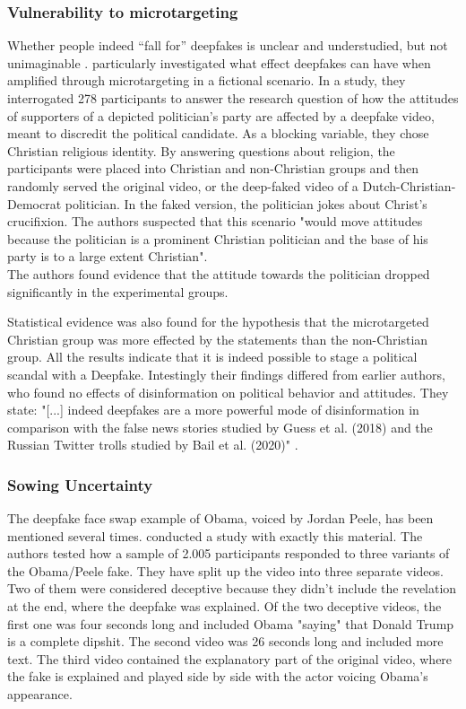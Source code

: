 \documentclass[
  a4paper,  %
  twoside,  %
  bibliography=totoc,
  headsepline,
  cleardoublepage=empty,
  parskip=half,
  draft=false
]{scrbook}
\begin{document}
\subsubsection*{Vulnerability to microtargeting}
Whether people indeed “fall for” deepfakes is unclear and understudied, but not unimaginable \cite{dobberMicrotargetedDeepfakesHave2021}. \citet{dobberMicrotargetedDeepfakesHave2021} particularly investigated what effect deepfakes can have when amplified through microtargeting in a fictional scenario. In a study, they interrogated 278 participants to answer the research question of how the attitudes of supporters of a depicted politician's party are affected by a deepfake video, meant to discredit the political candidate. As a blocking variable, they chose Christian religious identity. By answering questions about religion, the participants were placed into Christian and non-Christian groups and then randomly served the original video, or the deep-faked video of a Dutch-Christian-Democrat politician. In the faked version, the politician jokes about Christ's crucifixion. The authors suspected that this scenario "would move attitudes because the politician is a prominent Christian politician and the base of his party is to a large extent Christian". \\
The authors found evidence that the attitude towards the politician dropped significantly in the experimental groups.

Statistical evidence was also found for the hypothesis that the microtargeted Christian group was more effected by the statements than the non-Christian group. All the results indicate that it is indeed possible to stage a political scandal with a Deepfake. Intestingly their findings differed from earlier authors, who found no effects of disinformation on political behavior and attitudes. They state: "[...] indeed deepfakes are a more powerful mode of disinformation in comparison with the false news stories studied by Guess et al. (2018) and the Russian Twitter trolls studied by Bail et al. (2020)" \cite{dobberMicrotargetedDeepfakesHave2021}.

\subsubsection*{Sowing Uncertainty}
The deepfake face swap example of Obama, voiced by Jordan Peele, has been mentioned several times. \citeauthor{vaccariDeepfakesDisinformationExploring2020} conducted a study with exactly this material. The authors tested how a sample of 2.005 participants responded to three variants of the Obama/Peele fake. They have split up the video into three separate videos. Two of them were considered deceptive because they didn't include the revelation at the end, where the deepfake was explained. Of the two deceptive videos, the first one was four seconds long and included Obama "saying" that Donald Trump is a complete dipshit. The second video was 26 seconds long and included more text. The third video contained the explanatory part of the original video, where the fake is explained and played side by side with the actor voicing Obama's appearance.
\end{document}
